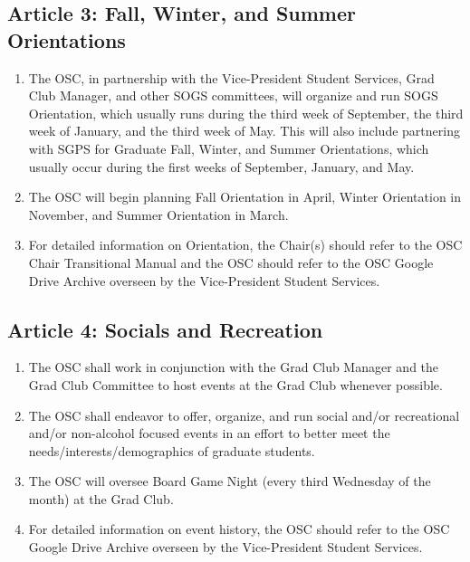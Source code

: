 \subsection{Article 3: Fall, Winter, and Summer Orientations}
\begin{enumerate}[label*=\arabic*., align=left]	
\item The OSC, in partnership with the Vice-President Student Services, Grad Club Manager, and other SOGS committees, will organize and run SOGS Orientation, which usually runs during the third week of September, the third week of January, and the third week of May. This will also include partnering with SGPS for Graduate Fall, Winter, and Summer Orientations, which usually occur during the first weeks of September, January, and May.
\item The OSC will begin planning Fall Orientation in April, Winter Orientation in November, and Summer Orientation in March.
\item For detailed information on Orientation, the Chair(s) should refer to the OSC Chair Transitional Manual and the OSC should refer to the OSC Google Drive Archive overseen by the Vice-President Student Services.
\end{enumerate}

\subsection{Article 4: Socials and Recreation}
\begin{enumerate}[label*=\arabic*., align=left]	
\item The OSC shall work in conjunction with the Grad Club Manager and the Grad Club Committee to host events at the Grad Club whenever possible.
\item The OSC shall endeavor to offer, organize, and run social and/or recreational and/or non-alcohol focused events in an effort to better meet the needs/interests/demographics of graduate students.
\item The OSC will oversee Board Game Night (every third Wednesday of the month) at the Grad Club.
\item For detailed information on event history, the OSC should refer to the OSC Google Drive Archive overseen
by the Vice-President Student Services.
\end{enumerate}

